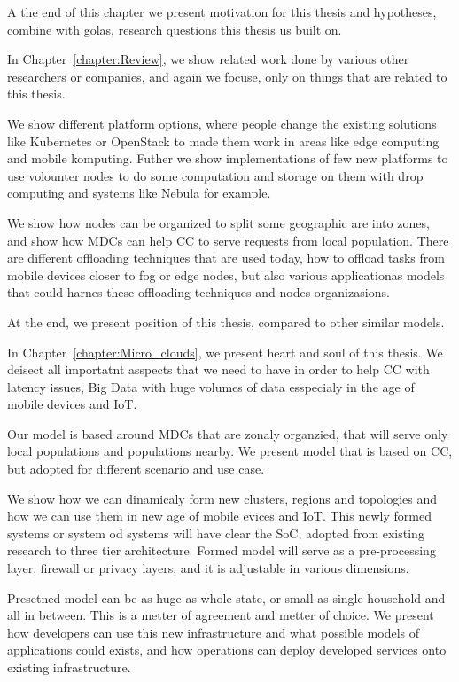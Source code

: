 A the end of this chapter we present motivation for this thesis and hypotheses, combine with golas, research questions this thesis us built on.

In Chapter~\ref{chapter:Review}, we show related work done by various other researchers or companies, and again we focuse, only on things that are related to this thesis.

We show different platform options, where people change the existing solutions like Kubernetes or OpenStack to made them work in areas like edge computing and mobile komputing. Futher we show implementations of few new platforms to use volounter nodes to do some computation and storage on them with drop computing and systems like Nebula for example.

We show how nodes can be organized to split some geographic are into zones, and show how MDCs can help CC to serve requests from local population. There are different offloading techniques that are used today, how to offload tasks from mobile devices closer to fog or edge nodes, but also various applicationas models that could harnes these offloading techniques and nodes organizasions.

At the end, we present position of this thesis, compared to other similar models.

In Chapter~\ref{chapter:Micro_clouds}, we present heart and soul of this thesis. We deisect all importatnt asspects that we need to have in order to help CC with latency issues, Big Data with huge volumes of data esspecialy in the age of mobile devices and IoT.

Our model is based around MDCs that are zonaly organzied, that will serve only local populations and populations nearby. We present model that is based on CC, but adopted for different scenario and use case.

We show how we can dinamicaly form new clusters, regions and topologies and how we can use them in new age of mobile evices and IoT. This newly formed systems or system od systems will have clear the SoC, adopted from existing research to three tier architecture. Formed model will serve as a pre-processing layer, firewall or privacy layers, and it is adjustable in various dimensions.

Presetned model can be as huge as whole state, or small as single household and all in between. This is a metter of agreement and metter of choice. We present how developers can use this new infrastructure and what possible models of applications could exists, and how operations can deploy developed services onto existing infrastructure.

